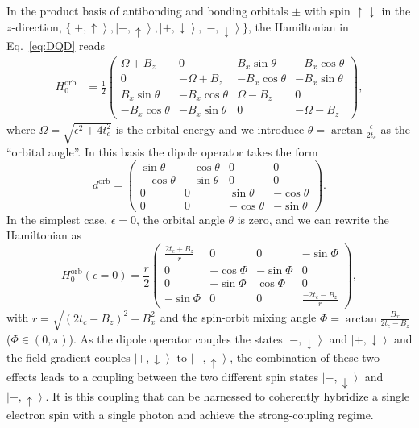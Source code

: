 \documentclass[twocolumn,english,aps,prl,preprint,reprint,showpacs,longbibliography,showkeys]{revtex4-1}
\begin{document}
In the product basis of antibonding and  bonding orbitals $\pm$ with spin $\uparrow\downarrow$ in the $z$-direction,  $\{\left|+,\uparrow\right\rangle,{\left|-,\uparrow\right\rangle},\left|+,\downarrow\right\rangle,\left|-,\downarrow\right\rangle\}$, the Hamiltonian in Eq.~\eqref{eq:DQD} reads
\begin{align}
H_{0}^{\mathrm{orb}}&=\frac{1}{2}\begin{pmatrix}
\Omega+B_z & 0 &  B_x\sin{\theta} & - B_x\cos{\theta} \\
0 & -\Omega+B_z & - B_x\cos{\theta} &  - B_x\sin{\theta}  \\
 B_x\sin{\theta} & - B_x\cos{\theta} &  \Omega-B_z & 0 \\
- B_x\cos{\theta} & -B_x\sin{\theta} & 0 & -\Omega-B_z
\end{pmatrix}, \label{eq:Horbital-basis}
\end{align}
where $\Omega=\sqrt{\epsilon^2+4t_c^2}$ is the orbital energy and we introduce ${\theta=\arctan{\frac{\epsilon}{2t_c}}}$ as the ``orbital angle''. In this basis the dipole operator takes the form
\begin{equation}
d^{\mathrm{orb}}=\begin{pmatrix}
\sin{\theta} & -\cos{\theta} & 0 & 0 \\
-\cos{\theta} & -\sin{\theta} & 0 & 0  \\
0 & 0 & \sin{\theta} & -\cos{\theta} \\
0 & 0 & -\cos{\theta}& -\sin{\theta}
\end{pmatrix}
.\label{eq:dmatrix}
\end{equation}
In the simplest case, $\epsilon=0$,  the orbital angle $\theta$ is zero, and we can rewrite the Hamiltonian as
\begin{equation}
H_{0}^{\mathrm{orb}}(\epsilon=0)=\frac{r}{2}\begin{pmatrix}
\frac{2t_c+B_z}{r} & 0 &  0 & - \sin{\Phi} \\
0 & - \cos{\Phi} & - \sin{\Phi} & 0 \\
 0 & - \sin{\Phi} &  \cos{\Phi} & 0 \\
- \sin{\Phi} & 0 & 0 & \frac{-2t_c-B_z}{r}
\end{pmatrix}
,  \label{eq:Horbital-basis-eps0}
\end{equation}
with ${r=\sqrt{(2t_c-B_z)^2+B_x^2}}$ and the spin-orbit mixing angle ${\Phi=\arctan{\frac{B_x}{2t_c-B_z}}}$ ($\Phi\in (0,\pi)$).
As the dipole operator couples the states $\left|-,\downarrow\right\rangle$ and $\left|+,\downarrow\right\rangle$  and the field gradient couples  $\left|+,\downarrow\right\rangle$ to  $\left|-,\uparrow\right\rangle$, the combination of these two effects leads to a coupling between the two different spin states $\left|-,\downarrow\right\rangle$ and $\left|-,\uparrow\right\rangle$. 
It is this coupling that can be harnessed to 
coherently hybridize a single electron spin with a single photon and 
achieve the strong-coupling regime.
\end{document}
